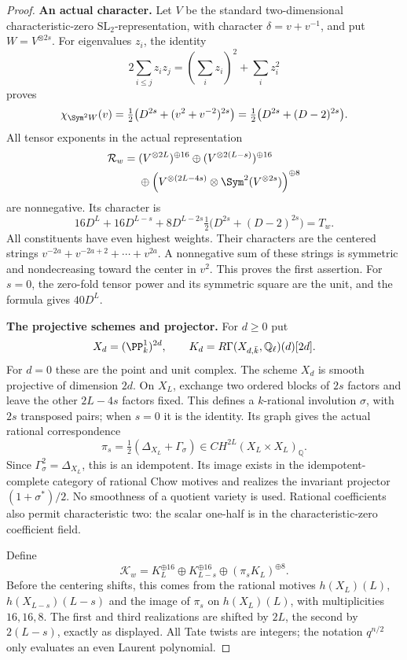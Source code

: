 \documentclass[11pt,a4paper]{article}
\newcommand{\Q}{\mathbb Q}\newcommand{\Z}{\mathbb Z}\newcommand{\C}{\mathbb C}\newcommand{\N}{\mathbb N}\newcommand{\F}{\mathbb F}
\theoremstyle{named}\newtheorem{finding}{Finding}[section]
\theoremstyle{definition}\newtheorem{definition}[finding]{Definition}
\theoremstyle{remark}\newtheorem{remark}[finding]{Remark}
\begin{document}
\begin{proof}
\par\smallskip\noindent\textbf{An actual character.}\quad
Let $V$ be the standard two-dimensional characteristic-zero
$\mathrm{SL}_2$-representation, with character $\delta=v+v^{-1}$,
and put $W=V^{\otimes2s}$. For eigenvalues $z_i$, the identity
\[
 2\sum_{i\le j}z_iz_j=(\sum_i z_i)^2+\sum_i z_i^2
\]
proves
\[
 \chi_{\Sym^2W}(v)
   =\tfrac12\bigl(D^{2s}+(v^2+v^{-2})^{2s}\bigr)
   =\tfrac12\bigl(D^{2s}+(D-2)^{2s}\bigr).
\]
All tensor exponents in the actual representation
\begin{align*}
 \mathcal R_w={}&(V^{\otimes2L})^{\oplus16}
 \oplus(V^{\otimes2(L-s)})^{\oplus16}\\
 &\oplus\left(V^{\otimes(2L-4s)}
                    \otimes\Sym^2(V^{\otimes2s})\right)^{\oplus8}
\end{align*}
are nonnegative. Its character is
\[
 16D^L+16D^{L-s}
 +8D^{L-2s}\tfrac12\bigl(D^{2s}+(D-2)^{2s}\bigr)=T_w.
\]
All constituents have even highest weights. Their characters are
the centered strings $v^{-2a}+v^{-2a+2}+\cdots+v^{2a}$.
A nonnegative sum of these strings is symmetric and nondecreasing
toward the center in $v^2$. This proves the first assertion.
For $s=0$, the zero-fold tensor power and its symmetric square
are the unit, and the formula gives $40D^L$.

\par\smallskip\noindent\textbf{The projective schemes and projector.}\quad
For $d\ge0$ put
\[
 X_d=(\PP^1_k)^{2d},\qquad
 K_d=R\Gamma(X_{d,\bar k},\Q_\ell)(d)[2d].
\]
For $d=0$ these are the point and unit complex. The scheme $X_d$
is smooth projective of dimension $2d$.
On $X_L$, exchange two ordered blocks of $2s$ factors and leave
the other $2L-4s$ factors fixed. This defines a $k$-rational
involution $\sigma$, with $2s$ transposed pairs; when $s=0$ it
is the identity. Its graph gives the actual rational correspondence
\[
 \pi_s=\tfrac12(\Delta_{X_L}+\Gamma_\sigma)
       \in CH^{2L}(X_L\times X_L)_\Q.
\]
Since $\Gamma_\sigma^2=\Delta_{X_L}$, this is an idempotent.
Its image exists in the idempotent-complete category of rational
Chow motives and realizes the invariant projector $(1+\sigma^*)/2$.
No smoothness of a quotient variety is used. Rational coefficients
also permit characteristic two: the scalar one-half is in the
characteristic-zero coefficient field.

Define
\begin{equation}\label{eq:wordcomplex}
 \mathcal K_w=K_L^{\oplus16}\oplus K_{L-s}^{\oplus16}
                         \oplus(\pi_sK_L)^{\oplus8}.
\end{equation}
Before the centering shifts, this comes from the rational motives
$h(X_L)(L)$, $h(X_{L-s})(L-s)$ and the image of $\pi_s$ on
$h(X_L)(L)$, with multiplicities $16,16,8$.
The first and third realizations are shifted by $2L$, the second
by $2(L-s)$, exactly as displayed. All Tate twists are integers;
the notation $q^{n/2}$ only evaluates an even Laurent polynomial.


\end{proof}
\end{document}
